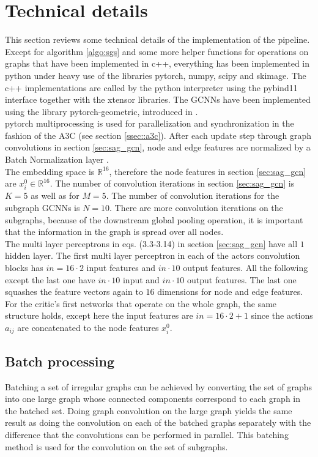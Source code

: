 \section{Technical details}\label{sec:tech}
This section reviews some technical details of the implementation of the pipeline. Except for algorithm \ref{algo:sgs} and some more helper functions for operations on graphs that have been implemented in c++, everything has been implemented in python under heavy use of the libraries pytorch, numpy, scipy and skimage. The c++ implementations are called by the python interpreter using the pybind11 interface together with the xtensor libraries. The GCNNs have been implemented using the library pytorch-geometric, introduced in \cite{Fey/Lenssen/2019}.\\
pytorch multiprocessing is used for parallelization and synchronization in the fashion of the A3C (see section \ref{ssec::a3c}). After each update step through graph convolutions in section \ref{sec:sag_gcn}, node and edge features are normalized by a Batch Normalization layer \cite{ioffe2015batch}.\\
The embedding space is $\mathbb{R}^{16}$, therefore the node features in section \ref{sec:sag_gcn} are $x_{i}^0 \in \mathbb{R}^{16}$. The number of convolution iterations in section \ref{sec:sag_gcn} is $K=5$ as well as for $M=5$. The number of convolution iterations for the subgraph GCNNs is $N=10$. There are more convolution iterations on the subgraphs, because of the downstream global pooling operation, it is important that the information in the graph is spread over all nodes.\\
The multi layer perceptrons in eqs. (3.3-3.14) in section \ref{sec:sag_gcn} have all $1$ hidden layer. The first multi layer perceptron in each of the actors convolution blocks has $in=16\cdot 2$ input features and $in\cdot 10$ output features. All the following except the last one have $in\cdot 10$ input and $in\cdot 10$ output features. The last one squashes the feature vectors again to $16$ dimensions for node and edge features. For the critic's first networks that operate on the whole graph, the same structure holds, except here the input features are $in=16\cdot 2 + 1$ since the actions $a_{ij}$ are concatenated to the node features $x_{i}^0$.


\subsection{Batch processing}\label{ssec:batchp}
Batching a set of irregular graphs can be achieved by converting the set of graphs into one large graph whose connected components correspond to each graph in the batched set. Doing graph convolution on the large graph yields the same result as doing the convolution on each of the batched graphs separately with the difference that the convolutions can be performed in parallel. This batching method is used for the convolution on the set of subgraphs.